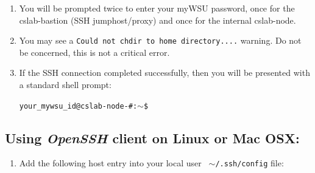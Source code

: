 \documentclass[12pt]{article}
\begin{document}
\begin{enumerate}
\item You will be prompted twice to enter your myWSU password, once for the cslab-bastion (SSH jumphost/proxy) and once for the internal cslab-node.
\item You may see a \texttt{Could not chdir to home directory....} warning. Do not be concerned, this is not a critical error.
\item If the SSH connection completed successfully, then you will be presented with a standard shell prompt:

\texttt{your\_mywsu\_id@cslab-node-\#:$\sim$\$}
\end{enumerate}

\subsection*{Using \textit{OpenSSH} client on Linux or Mac OSX:}
\begin{enumerate}
  \item Add the following host entry into your local user \texttt{ $\sim$/.ssh/config} file:
\end{enumerate}
\end{document}
